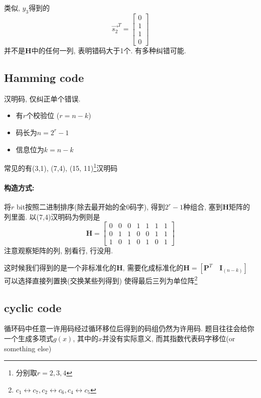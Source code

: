 \documentclass[a4paper]{report}
\begin{document}
类似, $y_3$得到的
\[
  \vec{s_2}^T=
  \begin{bmatrix}
    0\\1\\1\\0
  \end{bmatrix}
  \]
  并不是\textbf{H}中的任何一列, 表明错码大于1个. 有多种纠错可能. 

\subsection{Hamming code}
汉明码, 仅纠正单个错误. 
\begin{itemize}
  \item 有$r$个校验位 ($r=n-k$)
  \item 码长为$n=2^r-1$
  \item 信息位为$k=n-k$
\end{itemize}
常见的有(3,1), (7,4), (15, 11)\footnote{分别取$r=2,3,4$}汉明码

\paragraph{构造方式: }将$r$ bit按照二进制排序(除去最开始的全0码字), 得到$2^r-1$种组合, 塞到\textbf{H}矩阵的列里面. 以(7,4)汉明码为例则是
\[
  \textbf{H}=
  \begin{bmatrix}
    0&0&0&1&1&1&1\\
    0&1&1&0&0&1&1\\
    1&0&1&0&1&0&1
  \end{bmatrix}
  \]
注意观察矩阵的列, 别看行, 行没用. 

这时候我们得到的是一个非标准化的\textbf{H}, 需要化成标准化的$\textbf{H}=[\textbf{P}^T \quad \textbf{I}_{(n-k)}]$
可以选择直接列置换(交换某些列得到) 使得最后三列为单位阵\footnote{$c_1\leftrightarrow c_7,c_2\leftrightarrow c_6, c_4\leftrightarrow c_5$}
    

\subsection{cyclic code}
循环码中任意一许用码经过循环移位后得到的码组仍然为许用码. 
题目往往会给你一个生成多项式$g(x)$, 其中的$x$并没有实际意义, 而其指数代表码字移位(or something else)
\end{document}
